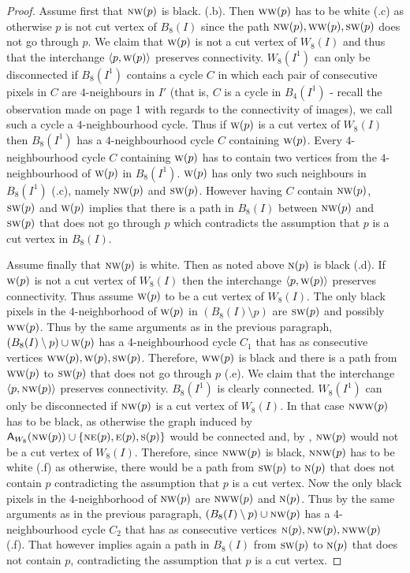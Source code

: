 \documentclass[lotsofwhite,charterfonts]{patmorin}
\newcommand{\N}{\textsc{n}}
\newcommand{\NE}{\textsc{ne}}
\newcommand{\E}{\textsc{e}}
\renewcommand{\S}{\textsc{s}}
\newcommand{\SW}{\textsc{sw}}
\newcommand{\W}{\textsc{w}}
\newcommand{\NW}{\textsc{nw}}
\newcommand{\ic}[2]{\langle #1,#2 \rangle}
\newcommand{\A}[2]{\ensuremath{\protect\textup{\textsf{A}}_{#2}(#1)}}
\newcommand{\sm}{\ensuremath{\setminus}}
\begin{document}
\begin{proof}
Assume first that $\NW(p)$ is black. (.b). Then
$\W\W(p)$ has to be white (.c) as otherwise $p$ is not
cut vertex of $B_8(I)$ since the path $\NW(p),\W\W(p) , \SW(p)$ does
not go through $p$. We claim that $\W(p)$ is not a cut vertex of
$W_8(I)$ and thus that the interchange $\ic{p}{\W(p)}$ preserves
connectivity.  $W_8(I^1)$ can only be disconnected if $B_8(I^1)$
contains a cycle $C$ in which each pair of consecutive pixels in $C$
are $4$-neighbours in $I'$ (that is, $C$ is a cycle in $B_4(I^1)$ -
recall the observation made on page 1 with regards to the connectivity
of images), we call such a cycle a $4$-neighbourhood cycle. Thus if
$\W(p)$ is a cut vertex of $W_8(I)$ then $B_8(I^1)$ has a
$4$-neighbourhood cycle $C$ containing  $\W(p)$. Every
$4$-neighbourhood cycle $C$ containing  $\W(p)$ has to contain two
vertices from the $4$-neighbourhood of $\W(p)$ in $B_8(I^1)$. $\W(p)$
has only two such neighbours in $B_8(I^1)$ (.c), namely
$\NW(p)$ and $\SW(p)$. However having $C$ contain  $\NW(p)$, $\SW(p)$
and $\W(p)$ implies that there is a path in $B_8(I)$ between $\NW(p)$
and $\SW(p)$ that does not go through $p$ which contradicts the
assumption that $p$ is a cut vertex in $B_8(I)$.

Assume finally that $\NW(p)$ is white. Then as noted above $\N(p)$ is
black (.d). If $\W(p)$ is not a cut vertex of $W_8(I)$
then  the interchange $\ic{p}{\W(p)}$ preserves connectivity. Thus
assume $\W(p)$ to be a cut vertex of $W_8(I)$. The only black pixels
in the $4$-neighborhood of $\W(p)$ in $(B_8(I)\sm p)$ are $\SW(p)$ and
possibly $\W\W(p)$. Thus by the same arguments as in the previous
paragraph, $(B_8(I)\sm p)\cup \W(p) $ has a 4-neighbourhood cycle
$C_1$ that has  as consecutive vertices $\W\W(p), \W(p), \SW(p)$.
Therefore, $\W\W(p)$ is black and there is a path from $\W\W(p)$ to
$\SW(p)$ that does not go through $p$ (.e). We claim
that the interchange $\ic{p}{\NW(p)}$ preserves connectivity.
$B_8(I^1)$ is clearly connected. $W_8(I^1)$ can only be disconnected
if $\NW(p)$ is a cut vertex of $W_8(I)$. In that case $\NW\W(p)$ has
to be black, as otherwise the graph induced by $\A{\NW(p)}{W_8}\cup
\{\NE(p), \E(p), \S(p)\}$ would be connected and, by ,
$\NW(p)$ would not be a cut vertex of $W_8(I)$. Therefore, since
$\NW\W(p)$ is black, $\N\NW(p)$ has to be  white (.f)
as otherwise, there would be a path from $\SW(p)$ to $\N(p)$  that
does not contain $p$ contradicting the assumption that $p$ is a cut
vertex.  Now the only black pixels in the $4$-neighborhood of $\NW(p)$
are $\NW\W(p)$ and  $\N(p)$. Thus by the same arguments as in the
previous paragraph, $(B_8(I)\sm p)\cup \NW(p) $ has a 4-neighbourhood
cycle $C_2$ that has as consecutive vertices $\N(p), \NW(p),
\N\W\W(p)$ (.f). That however implies again a path in
$B_8(I)$ from $\SW(p)$ to $\N(p)$ that does not contain $p$,
contradicting the assumption that $p$ is a cut vertex.  
\end{proof}
\end{document}
